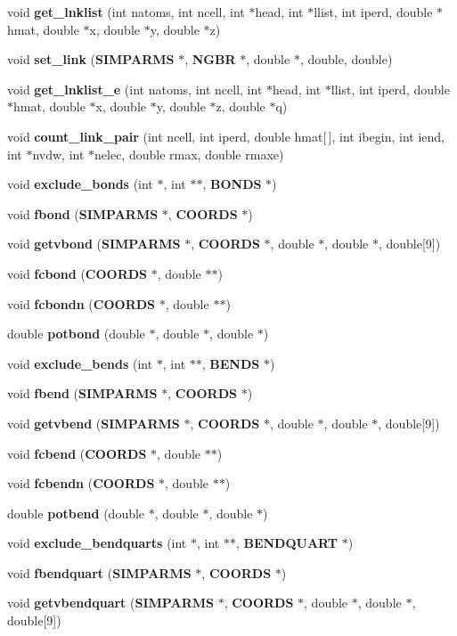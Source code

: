 \begin{CompactItemize}
void {\bf get\_\-lnklist} (int natoms, int ncell, int $\ast$head, int $\ast$llist, int iperd, double $\ast$hmat, double $\ast$x, double $\ast$y, double $\ast$z)
\item 
void {\bf set\_\-link} ({\bf SIMPARMS} $\ast$, {\bf NGBR} $\ast$, double $\ast$, double, double)
\item 
void {\bf get\_\-lnklist\_\-e} (int natoms, int ncell, int $\ast$head, int $\ast$llist, int iperd, double $\ast$hmat, double $\ast$x, double $\ast$y, double $\ast$z, double $\ast$q)
\item 
void {\bf count\_\-link\_\-pair} (int ncell, int iperd, double hmat[$\,$], int ibegin, int iend, int $\ast$nvdw, int $\ast$nelec, double rmax, double rmaxe)
\item 
void {\bf exclude\_\-bonds} (int $\ast$, int $\ast$$\ast$, {\bf BONDS} $\ast$)
\item 
void {\bf fbond} ({\bf SIMPARMS} $\ast$, {\bf COORDS} $\ast$)
\item 
void {\bf getvbond} ({\bf SIMPARMS} $\ast$, {\bf COORDS} $\ast$, double $\ast$, double $\ast$, double[9])
\item 
void {\bf fcbond} ({\bf COORDS} $\ast$, double $\ast$$\ast$)
\item 
void {\bf fcbondn} ({\bf COORDS} $\ast$, double $\ast$$\ast$)
\item 
double {\bf potbond} (double $\ast$, double $\ast$, double $\ast$)
\item 
void {\bf exclude\_\-bends} (int $\ast$, int $\ast$$\ast$, {\bf BENDS} $\ast$)
\item 
void {\bf fbend} ({\bf SIMPARMS} $\ast$, {\bf COORDS} $\ast$)
\item 
void {\bf getvbend} ({\bf SIMPARMS} $\ast$, {\bf COORDS} $\ast$, double $\ast$, double $\ast$, double[9])
\item 
void {\bf fcbend} ({\bf COORDS} $\ast$, double $\ast$$\ast$)
\item 
void {\bf fcbendn} ({\bf COORDS} $\ast$, double $\ast$$\ast$)
\item 
double {\bf potbend} (double $\ast$, double $\ast$, double $\ast$)
\item 
void {\bf exclude\_\-bendquarts} (int $\ast$, int $\ast$$\ast$, {\bf BENDQUART} $\ast$)
\item 
void {\bf fbendquart} ({\bf SIMPARMS} $\ast$, {\bf COORDS} $\ast$)
\item 
void {\bf getvbendquart} ({\bf SIMPARMS} $\ast$, {\bf COORDS} $\ast$, double $\ast$, double $\ast$, double[9])
\item 
$$
\end{CompactItemize}
